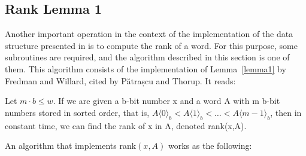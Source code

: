 \subsection{Rank Lemma 1} \label{sec:rankLemma1}

Another important operation in the context of the implementation of the data structure presented in \cite{patrascu2014dynamic} is to compute the rank of a word. For this purpose, some subroutines are required, and the algorithm described in this section is one of them. This algorithm consists of the implementation of Lemma~\ref{lemma1} by Fredman and Willard, cited by Pătrașcu and Thorup. It reads:
\begin{lemma} \label{lemma1}
Let $m \cdot b \leq w$. If we are given a b-bit number x and a word A with m b-bit numbers stored in sorted order, that is, $A\langle 0 \rangle_b < A\langle 1 \rangle_b < \dots < A\langle m - 1 \rangle_b$, then in constant time, we can find the rank of x in A, denoted rank(x,A).
\end{lemma}
An algorithm that implements rank$(x,A)$ works as the following:

